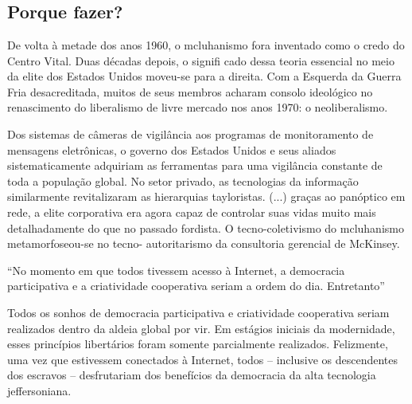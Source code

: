 %

\chapter*[]{}
{}%



\section{Porque fazer?}
\begin{citacao}
De volta à metade dos anos 1960, o mcluhanismo fora inventado
como o credo do Centro Vital. Duas décadas depois, o signifi cado dessa teoria essencial no meio da elite dos Estados Unidos moveu-se para a direita. Com a Esquerda da Guerra Fria desacreditada, muitos de seus membros acharam consolo ideológico no renascimento do liberalismo de livre mercado nos anos 1970: o neoliberalismo.\cite[347]{Barbrook2009}
\end{citacao}

\begin{citacao}
Dos sistemas de câmeras de vigilância aos programas de monitoramento de mensagens eletrônicas, o governo dos Estados Unidos e seus aliados sistematicamente adquiriam as ferramentas para uma vigilância constante de toda a população global. No setor privado, as tecnologias da informação similarmente revitalizaram as hierarquias tayloristas. (...) graças ao panóptico em rede, a elite corporativa era agora capaz de controlar suas vidas muito mais detalhadamente do que no passado fordista. O tecno-coletivismo do mcluhanismo metamorfoseou-se no tecno- autoritarismo da consultoria gerencial de McKinsey. \cite[345]{Barbrook2009}
\end{citacao}

``No momento em que todos tivessem acesso à Internet, a democracia participativa e a criatividade cooperativa seriam a ordem do dia. Entretanto'' \cite[360]{Barbrook2009}

\begin{citacao}
Todos os sonhos de democracia participativa e criatividade cooperativa seriam realizados dentro da aldeia global por vir. Em estágios iniciais da modernidade, esses princípios libertários foram somente parcialmente realizados. Felizmente, uma vez que estivessem conectados à Internet, todos – inclusive os descendentes dos escravos – desfrutariam dos benefícios da democracia da alta tecnologia jeffersoniana.
\end{citacao}
  
